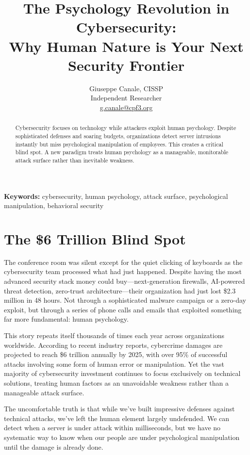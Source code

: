 \documentclass[10pt, twocolumn]{article}
\title{\LARGE The Psychology Revolution in Cybersecurity:\\Why Human Nature is Your Next Security Frontier}
\author{
\large Giuseppe Canale, CISSP\\
\normalsize Independent Researcher\\
\normalsize \href{mailto:g.canale@cpf3.org}{g.canale@cpf3.org}
}
\date{}
\begin{document}
\maketitle

\begin{abstract}
Cybersecurity focuses on technology while attackers exploit human psychology. Despite sophisticated defenses and soaring budgets, organizations detect server intrusions instantly but miss psychological manipulation of employees. This creates a critical blind spot. A new paradigm treats human psychology as a manageable, monitorable attack surface rather than inevitable weakness.
\end{abstract}

\textbf{Keywords:} cybersecurity, human psychology, attack surface, psychological manipulation, behavioral security

\section{The \$6 Trillion Blind Spot}

The conference room was silent except for the quiet clicking of keyboards as the cybersecurity team processed what had just happened. Despite having the most advanced security stack money could buy—next-generation firewalls, AI-powered threat detection, zero-trust architecture—their organization had just lost \$2.3 million in 48 hours. Not through a sophisticated malware campaign or a zero-day exploit, but through a series of phone calls and emails that exploited something far more fundamental: human psychology.

This story repeats itself thousands of times each year across organizations worldwide. According to recent industry reports, cybercrime damages are projected to reach \$6 trillion annually by 2025, with over 95\% of successful attacks involving some form of human error or manipulation. Yet the vast majority of cybersecurity investment continues to focus exclusively on technical solutions, treating human factors as an unavoidable weakness rather than a manageable attack surface.

The uncomfortable truth is that while we've built impressive defenses against technical attacks, we've left the human element largely undefended. We can detect when a server is under attack within milliseconds, but we have no systematic way to know when our people are under psychological manipulation until the damage is already done.
\end{document}
